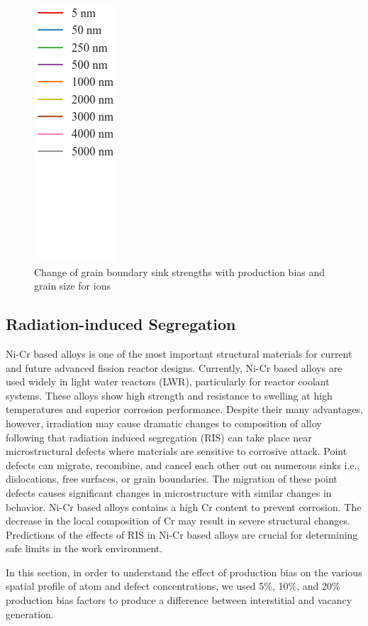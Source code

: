 \documentclass[utf8]{frontiersSCNS} %
\begin{document}
\begin{figure}[h!]
        \includegraphics[scale=0.35]{legend}
        \caption{Change of grain boundary sink strengths with production bias and grain size for ions}
        \label{figure:sink_strengths_ion_bias_Z}
    \end{figure}
\newpage
\subsection{Radiation-induced Segregation}

    Ni-Cr based alloys is one of the most important structural materials for current and future advanced fission reactor designs. Currently, Ni-Cr based alloys are used widely in light water reactors (LWR), particularly for reactor coolant systems. These alloys show high strength and resistance to swelling at high temperatures and superior corrosion performance. Despite their many advantages, however, irradiation may cause dramatic changes to composition of alloy following that radiation induced segregation (RIS) can take place near microstructural defects where materials are sensitive to corrosive attack. Point defects can migrate, recombine, and cancel each other out on numerous sinks i.e., dislocations, free surfaces, or grain boundaries. The migration of these point defects causes significant changes in microstructure with similar changes in behavior. Ni-Cr based alloys contains a high Cr content to prevent corrosion. The decrease in the local composition of Cr may result in severe structural changes. Predictions of the effects of RIS in Ni-Cr based alloys are crucial for determining safe limits in the work environment.

    In this section, in order to understand the effect of production bias on the various spatial profile of atom and defect concentrations, we used 5\%, 10\%, and 20\% production bias factors to produce a difference between interstitial and vacancy generation.
    \\
\end{document}
